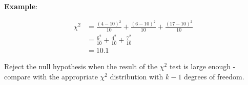 \begin{paracol}{2}

\textbf{Example}:

\begin{align*}
    \chi^2 & = \frac{(4-10)^2}{10} + \frac{(6-10)^2}{10} + \frac{(17-10)^2}{10} \\
    & = \frac{6^2}{10} + \frac{4^2}{10} + \frac{7^2}{10} \\
    & = 10.1
\end{align*}

Reject the null hypothesis when the result of the $\chi^2$ test is large enough - compare with the appropriate $\chi^2$ distribution with $k-1$ degrees of freedom.

\end{paracol}
